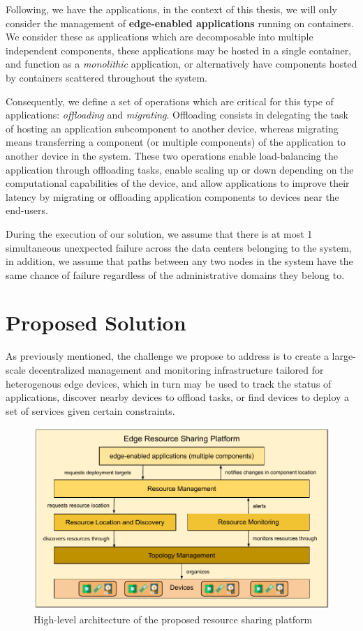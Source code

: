 Following, we have the applications, in the context of this thesis, we will only consider the management of \textbf{edge-enabled applications} running on containers. We consider these as applications which are decomposable into  multiple independent components, these applications may be hosted in a single container, and function as a \textit{monolithic} application, or alternatively have components hosted by containers scattered throughout the system.

Consequently, we define a set of operations which are critical for this type of applications: \textit{offloading} and \textit{migrating}. Offloading consists in delegating the task of hosting an application subcomponent to another device, whereas migrating means transferring a component (or multiple components) of the application to another device in the system. These two operations enable load-balancing the application through offloading tasks, enable scaling up or down depending on the computational capabilities of the device, and allow applications to improve their latency by migrating or offloading application components to devices near the end-users. 

During the execution of our solution, we assume that there is at most 1 simultaneous unexpected failure across the data centers belonging to the system, in addition, we assume that paths between any two nodes in the system have the same chance of failure regardless of the administrative domains they belong to.

\section{Proposed Solution}
\label{cha:proposed_sol}

As previously mentioned, the challenge we propose to address is to create a large-scale decentralized management and monitoring infrastructure tailored for heterogenous edge devices, which in turn may be used to track the status of applications, discover nearby devices to offload tasks, or find devices to deploy a set of services given certain constraints. 

\begin{figure}
    \centering
    \includegraphics[width=0.9\linewidth]{Figures/proposed_architecture_detailed.pdf}
    \caption{High-level architecture of the proposed resource sharing platform}
    \label{fig:proposed_architecture_detailed}
\end{figure}

